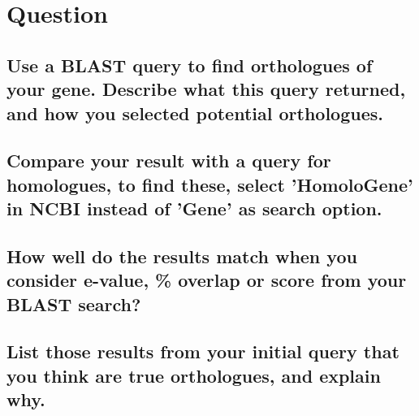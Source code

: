 \section{Question}

\subsection{Use a BLAST query to find orthologues of your gene. Describe what this query returned, and how you selected potential orthologues.}


\subsection{Compare your result with a query for homologues, to find these, select 'HomoloGene' in NCBI instead of 'Gene' as search option.}


\subsection{How well do the results match when you consider e-value, \% overlap or score from your BLAST search?}


\subsection{List those results from your initial query that you think are true orthologues, and explain why.}

\newpage
